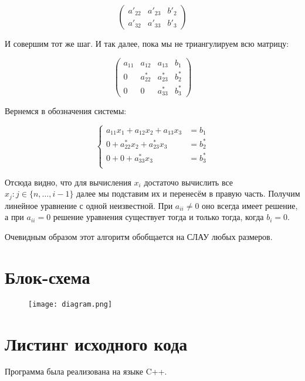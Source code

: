\documentclass[12pt]{article}
\begin{document}
\[
\begin{pmatrix}
a'_{22} & a'_{23} & b'_2 \\
a'_{32} & a'_{33} & b'_3
\end{pmatrix}
\]

И совершим тот же шаг. И так далее, пока мы не триангулируем всю матрицу:

\[
\begin{pmatrix}
a_{11} & a_{12} & a_{13} & b_1 \\
0 & a^*_{22} & a^*_{23} & b^*_2 \\
0 & 0 & a^*_{33} & b^*_3
\end{pmatrix}
\]

Вернемся в обозначения системы:

\[
    \left\{
    \begin{aligned}
    a_{11}x_1 + a_{12}x_2 + a_{13}x_3 &= b_1 \\
    0 + a^*_{22}x_2 + a^*_{23}x_3 &= b^*_2 \\
    0 + 0+ a^*_{33}x_3 &= b^*_3 \\
    \end{aligned}
    \right.
\]

Отсюда видно, что для вычисления $x_i$ достаточо вычислить все $x_j: j \in \{n, \dots, i - 1\}$ далее мы подставим их и перенесём в правую часть. Получим линейное уравнение с одной неизвестной. При $a_{ii} \ne 0$ оно всегда имеет решение, а при $a_{ii} = 0$ решение уравнения существует тогда и только тогда, когда $b_i = 0$.

Очевидным образом этот алгоритм обобщается на СЛАУ любых размеров.


\section{Блок-схема}

\begin{figure}[h]
  \centering
  \texttt{[image: diagram.png]}
\end{figure}


\section{Листинг исходного кода}
Программа была реализована на языке C++.
\end{document}
